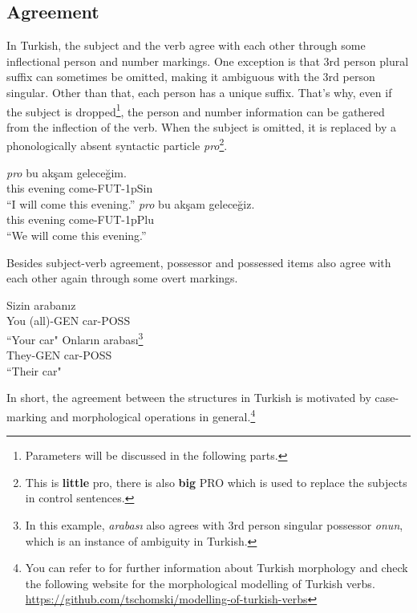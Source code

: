 \documentclass[11pt,a4paper]{article}
\begin{document}
\subsection{Agreement}
In Turkish, the subject and the verb agree with each other through some inflectional person and number markings. One exception is that 3rd person plural suffix can sometimes be omitted, making it ambiguous with the 3rd person singular. Other than that, each person has a unique suffix. That’s why, even if the subject is dropped\footnote{Parameters will be discussed in the following parts.}, the person and number information can be gathered from the inflection of the verb. When the subject is omitted, it is replaced by a phonologically absent syntactic particle \emph{pro}\footnote{This is \textbf{little} pro, there is also \textbf{big} PRO which is used to replace the subjects in control sentences.}.
\begin{exe}
		\ex
			\begin{xlist}
				\ex \emph{pro} bu akşam geleceğim.\\
				this evening come-FUT-1pSin\\
				``I will come this evening.”
				\ex \emph{pro} bu akşam geleceğiz.\\
				this evening come-FUT-1pPlu\\
				``We will come this evening.”
			\end{xlist}
	\end{exe}
Besides subject-verb agreement, possessor and possessed items also agree with each other again through some overt markings.
\begin{exe}
		\ex
			\begin{xlist}
				\ex Sizin arabanız\\
				You (all)-GEN car-POSS\\
				``Your car"
				\ex Onların arabası\footnote{In this example, \emph{arabası} also agrees with 3rd person singular possessor \emph{onun}, which is an instance of ambiguity in Turkish.}\\
They-GEN car-POSS\\
``Their car"
			\end{xlist}
	\end{exe}
In short, the agreement between the structures in Turkish is motivated by case-marking and morphological operations in general.\footnote{You can refer to \textcite{oflazer} for further information about Turkish morphology and check the following website for the morphological modelling of Turkish verbs. \url{https://github.com/tschomski/modelling-of-turkish-verbs}}
\end{document}
